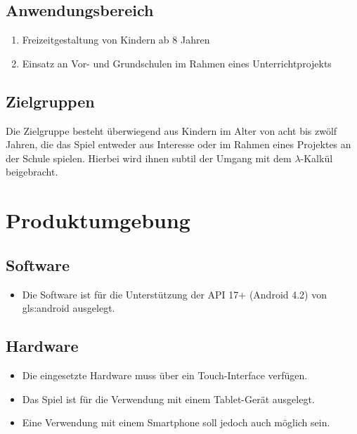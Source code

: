 \documentclass{scrartcl}
\begin{document}
\subsection{Anwendungsbereich}

\begin{enumerate}
	\item Freizeitgestaltung von Kindern ab 8 Jahren
	\item Einsatz an Vor- und Grundschulen im Rahmen eines Unterrichtprojekts
\end{enumerate}

\subsection{Zielgruppen}

Die Zielgruppe besteht überwiegend aus Kindern im Alter von acht bis zwölf Jahren, die das Spiel entweder aus Interesse oder im Rahmen eines Projektes an der Schule spielen. Hierbei wird ihnen subtil der Umgang mit dem $\lambda$-Kalkül beigebracht.

\clearpage








\section{Produktumgebung}

\subsection{Software}

\begin{itemize}
	\item Die Software ist für die Unterstützung der API 17+ (Android 4.2) von \gls{gls:android} ausgelegt.
\end{itemize}

\subsection{Hardware}

\begin{itemize}
	\item Die eingesetzte Hardware muss über ein Touch-Interface verfügen.
	\item Das Spiel ist für die Verwendung mit einem Tablet-Gerät ausgelegt.
	\item Eine Verwendung mit einem Smartphone soll jedoch auch möglich sein.
\end{itemize}
\end{document}
